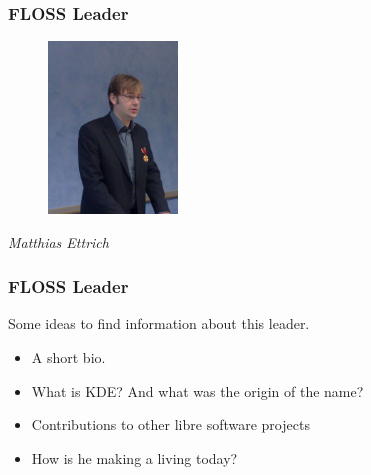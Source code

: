 \documentclass{beamer}
\begin{document}
\begin{frame}
\frametitle{FLOSS Leader}

\begin{figure}[h]
\begin{center}
  \includegraphics[height=1.80in]{figs/Matthias_Ettrich.jpg}
\end{center}
\end{figure}

\pause

\begin{center}
{\it Matthias Ettrich}
\end{center}

\end{frame}


\begin{frame}
\frametitle{FLOSS Leader}

Some ideas to find information about this leader.
\pause
\begin{itemize}
\item A short bio.
\item What is KDE? And what was the origin of the name?
\item Contributions to other libre software projects 
\item How is he making a living today?
\end{itemize}

\end{frame}
\end{document}
